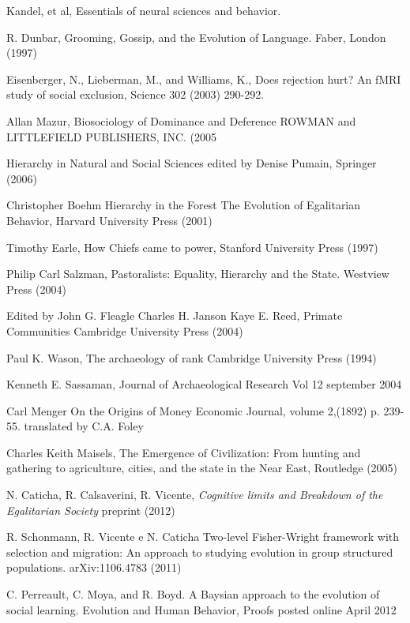 \documentclass[11pt]{article}
\begin{document}
\begin{thebibliography}{99}
 Kandel, et al, Essentials of neural sciences and behavior.


 R. Dunbar,  Grooming, Gossip, and the
Evolution of Language. Faber, London (1997)

 Eisenberger, N., Lieberman, M., and Williams, K., Does rejection hurt? An fMRI
study of social exclusion, Science 302 (2003) 290-292.

 Allan Mazur,
Biosociology
of Dominance
and Deference
ROWMAN and LITTLEFIELD PUBLISHERS, INC.
(2005

Hierarchy in Natural
and Social Sciences
edited by
Denise Pumain, Springer (2006)

Christopher Boehm
Hierarchy in the Forest
The Evolution of
Egalitarian Behavior, Harvard University Press (2001)

 Timothy Earle,
How Chiefs came to power, Stanford University Press (1997)

 Philip Carl Salzman, Pastoralists: Equality, Hierarchy and
the State. Westview Press (2004)

Edited by
John G. Fleagle
Charles H. Janson
Kaye E. Reed, Primate Communities
Cambridge University Press (2004)

 Paul K. Wason, The archaeology of rank
Cambridge University Press (1994)

 Kenneth E. Sassaman, Journal of Archaeological Research Vol 12 september 2004

 Carl Menger
On the Origins of Money
Economic Journal, volume 2,(1892) p. 239-55.
translated by C.A. Foley

Charles Keith Maisels, The Emergence of
Civilization:
From hunting and gathering to
agriculture, cities, and the state in the
Near East,
Routledge   (2005)

 N. Caticha, R. Calsaverini, R. Vicente, {\it
Cognitive limits and Breakdown of the Egalitarian Society} preprint   (2012)

 R. Schonmann, R. Vicente e N. Caticha
Two-level Fisher-Wright framework with selection and migration: An approach to studying evolution in group structured populations.
arXiv:1106.4783 (2011)

C. Perreault, C. Moya, and R. Boyd. A Baysian approach to the evolution of social learning. Evolution and Human Behavior, Proofs posted online April 2012


\end{thebibliography}
\end{document}
